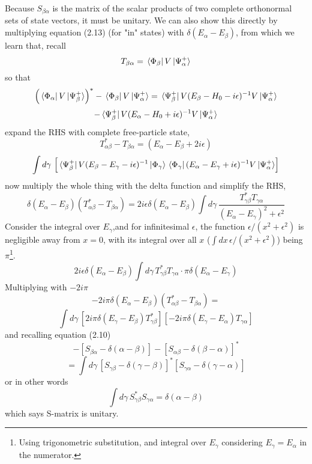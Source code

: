 \documentclass[12pt]{article}
\numberwithin{equation}{section}
\begin{document}
Because $S_{\beta\alpha}$ is the matrix of the scalar products of two complete orthonormal sets of state vectors, it must be unitary.
We can also show this directly by multiplying equation (2.13) (for "in" states) with $\delta(E_{\alpha}-E_{\beta})$, from which we learn that, recall
\[T_{\beta\alpha} = \bra*{\Phi_{\beta}}V\ket*{\Psi_{\alpha}^{+}}\]
so that 
\[\left(\bra*{\Phi_{\alpha}}V\ket*{\Psi_{\beta}^{+}}\right)^{*}-\bra*{\Phi_{\beta}}V\ket*{\Psi_{\alpha}^{+}} = \bra*{\Psi_{\beta}^{+}}V(E_{\beta}-H_0- i\epsilon)^{-1}V\ket*{\Psi_{\alpha}^{+}}\]
\[-\bra*{\Psi_{\beta}^{+}}V(E_{\alpha}-H_0+i\epsilon)^{-1}V\ket*{\Psi_{\alpha}^{+}}\]
expand the RHS with complete free-particle state,
\[T^{*}_{\alpha\beta}-T_{\beta\alpha} = (E_{\alpha}-E_{\beta}+2i\epsilon)\]\[\int{d\gamma\,\left[\bra*{\Psi^{+}_{\beta}}V(E_{\beta}-E_{\gamma}-i\epsilon)^{-1}\ket*{\Phi_{\gamma}}\bra*{\Phi_{\gamma}}(E_{\alpha}-E_{\gamma}+i\epsilon)^{-1}V\ket*{\Psi_{\alpha}^{+}}\right]}\]
now multiply the whole thing with the delta function and simplify the RHS,
\[\delta(E_{\alpha}-E_{\beta})\left(T_{\alpha\beta}^{*}-T_{\beta\alpha}\right)=2i\epsilon\delta(E_{\alpha}-E_{\beta})\int{d\gamma\,\frac{T_{\gamma\beta}^{*}T_{\gamma\alpha}}{(E_{\alpha}-E_{\gamma})^2+\epsilon^2}}\]
Consider the integral over $E_{\gamma}$,and for infinitesimal $\epsilon$, the function $\epsilon/(x^2+\epsilon^2)$ is negligible away from $x=0$, with its integral over all $x$ ($\int{dx\,\epsilon/(x^2+\epsilon^2)}$) being $\pi$\footnote{Using trigonometric substitution, and integral over $E_{\gamma}$ considering $E_{\gamma}=E_{\alpha}$ in the numerator.}.
\[2i\epsilon\delta(E_{\alpha}-E_{\beta})\int{d\gamma\,T_{\gamma\beta}^{*}T_{\gamma\alpha}\cdot\pi\delta(E_{\alpha}-E_{\gamma})}\]
Multiplying with $-2i\pi$
\[-2i\pi\delta(E_{\alpha}-E_{\beta})(T^{*}_{\alpha\beta}-T_{\beta\alpha})=\]
\[\int{d\gamma\,\left[2i\pi\delta(E_{\gamma}-E_{\beta})T_{\gamma\beta}^{*}\right]\left[-2i\pi\delta(E_{\gamma}-E_{\alpha})T_{\gamma\alpha}\right]}\]
and recalling equation (2.10)
\[
    -\left[S_{\beta\alpha}-\delta(\alpha-\beta)\right]-\left[S_{\alpha\beta}-\delta(\beta-\alpha)\right]^{*}
\]
\begin{equation}
    =\int{d\gamma\,\left[S_{\gamma\beta}-\delta(\gamma-\beta)\right]^{*}\left[S_{\gamma\alpha}-\delta(\gamma-\alpha)\right]}
\end{equation}
or in other words
\begin{equation}
    \int{d\gamma\,S_{\gamma\beta}^{*}S_{\gamma\alpha}} = \delta(\alpha-\beta)
\end{equation}
which says S-matrix is unitary.
\end{document}
